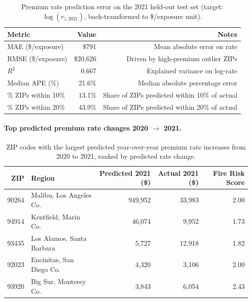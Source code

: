 \documentclass[11pt,a4paper]{article}
\begin{document}
\begin{table}[H]
\centering
\caption{Premium rate prediction error on the 2021 held-out test set
         (target: $\log(r_{z,2021})$, back-transformed to \$/exposure unit).}
\begin{tabular}{lrr}
\toprule
\textbf{Metric} & \textbf{Value} & \textbf{Notes} \\
\midrule
MAE (\$/exposure)     & \$791    & Mean absolute error on rate \\
RMSE (\$/exposure)    & \$20,626 & Driven by high-premium outlier ZIPs \\
$R^2$                 & 0.667    & Explained variance on log-rate \\
Median APE (\%)       & 21.6\%   & Median absolute percentage error \\
\% ZIPs within 10\%   & 13.1\%   & Share of ZIPs predicted within 10\% of actual \\
\% ZIPs within 20\%   & 43.9\%   & Share of ZIPs predicted within 20\% of actual \\
\bottomrule
\end{tabular}
\label{tab:task2_metrics}
\end{table}

\paragraph{Top predicted premium rate changes 2020 $\to$ 2021.}

\begin{table}[H]
\centering
\caption{ZIP codes with the largest predicted year-over-year premium rate
         increases from 2020 to 2021, ranked by predicted rate change.}
\begin{tabular}{rlrrr}
\toprule
\textbf{ZIP} & \textbf{Region} & \textbf{Predicted 2021 (\$)} & \textbf{Actual 2021 (\$)} & \textbf{Fire Risk Score} \\
\midrule
90264 & Malibu, Los Angeles Co.     & 949,952 & 33,983 & 2.00 \\
94914 & Kentfield, Marin Co.        &  46,074 &  9,952 & 1.73 \\
93435 & Los Alamos, Santa Barbara   &   5,727 & 12,918 & 1.82 \\
92023 & Encinitas, San Diego Co.    &   4,320 &  3,106 & 2.00 \\
93920 & Big Sur, Monterey Co.       &   3,843 &  6,054 & 2.43 \\
\bottomrule
\end{tabular}
\label{tab:task2_top_zips}
\end{table}
\end{document}
